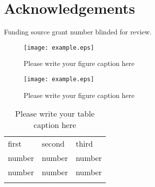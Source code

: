 \section*{Acknowledgements}

 Funding source grant number blinded for review.

\begin{figure}
  \texttt{[image: example.eps]}
\caption{Please write your figure caption here}
\label{fig:1}       %
\end{figure}
%
\begin{figure*}
  \texttt{[image: example.eps]}
\caption{Please write your figure caption here}
\label{fig:2}       %
\end{figure*}
%
\begin{table}
\caption{Please write your table caption here}
\label{tab:1}       %
\begin{tabular}{lll}
\hline\noalign{\smallskip}
first & second & third  \\
\noalign{\smallskip}\hline\noalign{\smallskip}
number & number & number \\
number & number & number \\
\noalign{\smallskip}\hline
\end{tabular}
\end{table}




\begin{thebibliography}{}
%
%


% 

%  



\end{thebibliography}




